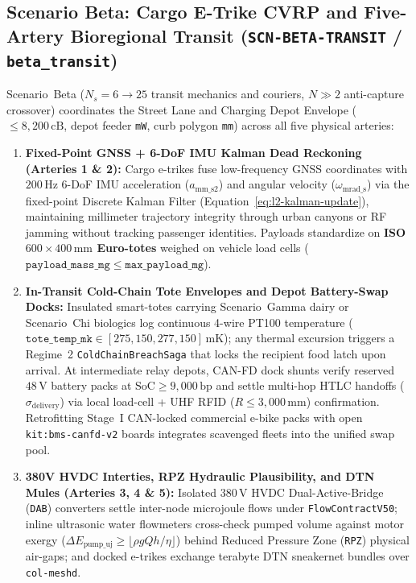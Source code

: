 \subsection{Scenario Beta: Cargo E-Trike CVRP and Five-Artery Bioregional Transit (\texttt{SCN-BETA-TRANSIT} / \texttt{beta\_transit})}

Scenario~Beta ($N_s = 6 \to 25$ transit mechanics and couriers, $N \gg 2$ anti-capture crossover) coordinates the Street Lane and Charging Depot Envelope ($\le 8{,}200\,\mathrm{cB}$, depot feeder \texttt{mW}, curb polygon \texttt{mm}) across all five physical arteries:
\begin{enumerate}
    \item \textbf{Fixed-Point GNSS + 6-DoF IMU Kalman Dead Reckoning (Arteries 1 \& 2):} Cargo e-trikes fuse low-frequency GNSS coordinates with $200\,\mathrm{Hz}$ 6-DoF IMU acceleration ($a_{\mathrm{mm\_s2}}$) and angular velocity ($\omega_{\mathrm{mrad\_s}}$) via the fixed-point Discrete Kalman Filter (Equation~\eqref{eq:l2-kalman-update}), maintaining millimeter trajectory integrity through urban canyons or RF jamming without tracking passenger identities. Payloads standardize on \textbf{ISO $600 \times 400\,\mathrm{mm}$ Euro-totes} weighed on vehicle load cells ($\mathtt{payload\_mass\_mg} \le \mathtt{max\_payload\_mg}$).
    \item \textbf{In-Transit Cold-Chain Tote Envelopes and Depot Battery-Swap Docks:} Insulated smart-totes carrying Scenario~Gamma dairy or Scenario~Chi biologics log continuous 4-wire PT100 temperature ($\mathtt{tote\_temp\_mk} \in [275{,}150, 277{,}150]\,\mathrm{mK}$); any thermal excursion triggers a Regime~2 \texttt{ColdChainBreachSaga} that locks the recipient food latch upon arrival. At intermediate relay depots, CAN-FD dock shunts verify reserved $48\,\mathrm{V}$ battery packs at $\mathrm{SoC} \ge 9{,}000\,\mathrm{bp}$ and settle multi-hop HTLC handoffs ($\sigma_{\mathrm{delivery}}$) via local load-cell + UHF RFID ($R \le 3{,}000\,\mathrm{mm}$) confirmation. Retrofitting Stage~I CAN-locked commercial e-bike packs with open \texttt{kit:bms-canfd-v2} boards integrates scavenged fleets into the unified swap pool.
    \item \textbf{380V HVDC Interties, RPZ Hydraulic Plausibility, and DTN Mules (Arteries 3, 4 \& 5):} Isolated $380\,\mathrm{V}$ HVDC Dual-Active-Bridge (\texttt{DAB}) converters settle inter-node microjoule flows under \texttt{FlowContractV50}; inline ultrasonic water flowmeters cross-check pumped volume against motor exergy ($\Delta E_{\mathrm{pump\_uj}} \ge \lfloor \rho g Q h / \eta \rfloor$) behind Reduced Pressure Zone (\texttt{RPZ}) physical air-gaps; and docked e-trikes exchange terabyte DTN sneakernet bundles over \texttt{col-meshd}.
\end{enumerate}
